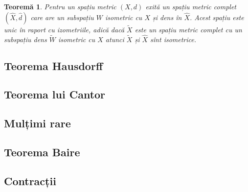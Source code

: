 \documentclass[a4paper,12pt]{article}
\theoremstyle{change}
\newtheorem{theorem}{Teoremă}[section]
\begin{document}
\begin{theorem}
Pentru un spațiu metric $(X, d)$ exită un spațiu metric complet $(\hat{X}, \hat{d})$ care are un subspațiu $W$ isometric cu $X$ și dens în $\hat{X}$. Acest spațiu este unic în raport cu izometriile, adică dacă $\tilde{X}$ este un spațiu metric complet cu un subspațiu dens $\tilde{W}$ isometric cu $X$ atunci $\tilde{X}$ și $\hat{X}$ sînt isometrice.
\end{theorem}

\subsection{Teorema Hausdorff}


\subsection{Teorema lui Cantor}

\subsection{Mulțimi rare}

\subsection{Teorema Baire}


\subsection{Contracții}
\end{document}
